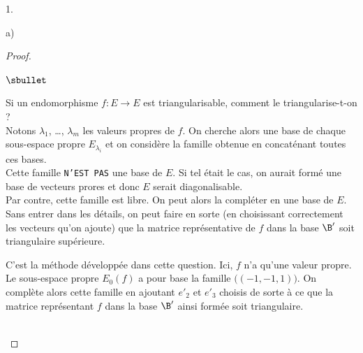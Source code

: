 \documentclass[11pt]{article}%
\begin{document}
\begin{noliste}{1.}
\begin{noliste}{a)}
\begin{proof}
\begin{remarkL}{.98}
\begin{noliste}{$\sbullet$}
      \item Si un endomorphisme $f : E \to E$ est triangularisable,
        comment le triangularise-t-on ? \\
        Notons $\lambda_1$, \ldots, $\lambda_m$ les valeurs propres de
        $f$. On cherche alors une base de chaque sous-espace propre
        $E_{\lambda_i}$ et on considère la famille obtenue en
        concaténant toutes ces bases.\\
        Cette famille {\tt N'EST PAS} une base de $E$. Si tel était le
        cas, on aurait formé une base de vecteurs prores et donc $E$
        serait diagonalisable. \\
        Par contre, cette famille est libre. On peut alors la
        compléter en une base de $E$.\\
        Sans entrer dans les détails, on peut faire en sorte (en
        choisissant correctement les vecteurs qu'on ajoute) que la
        matrice représentative de $f$ dans la base $\B'$ soit
        triangulaire supérieure.

      \item C'est la méthode développée dans cette question. Ici, $f$
        n'a qu'une valeur propre. Le sous-espace propre $E_0(f)$ a
        pour base la famille $\big( (-1, -1, 1) \big)$. On complète
        alors cette famille en ajoutant $e'_2$ et $e'_3$ choisis de
        sorte à ce que la matrice représentant $f$ dans la base $\B'$
        ainsi formée soit triangulaire.

      \end{noliste}
    \end{remarkL}~\\[-1.5cm]
    \end{proof}
  \end{noliste}
  

\end{noliste}
\end{document}
